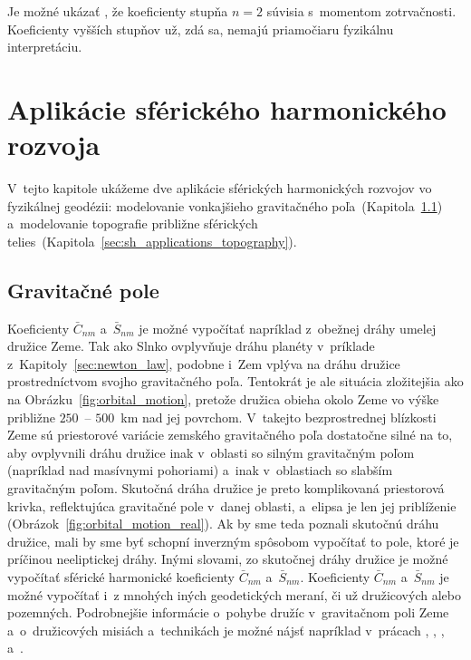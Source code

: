 \documentclass[a4paper, 12pt]{book}
\begin{document}
Je možné ukázať \parencite[napríklad][]{MoritzPhysicalGeodesy}, že koeficienty
stupňa $n = 2$ súvisia s~momentom zotrvačnosti.  Koeficienty vyšších stupňov
už, zdá sa, nemajú priamočiaru fyzikálnu interpretáciu.







\section{Aplikácie sférického harmonického rozvoja}
\label{sec:spherical_harmonics_applications}

V~tejto kapitole ukážeme dve aplikácie sférických harmonických rozvojov vo 
fyzikálnej geodézii: modelovanie vonkajšieho gravitačného 
poľa~(Kapitola~\ref{sec:sh_applications_gravity_field})
a~modelovanie topografie približne sférických 
telies~(Kapitola~\ref{sec:sh_applications_topography}).

\subsection{Gravitačné pole}
\label{sec:sh_applications_gravity_field}

Koeficienty $\bar{C}_{nm}$ a~$\bar{S}_{nm}$ je možné vypočítať napríklad 
z~obežnej dráhy umelej družice Zeme.  Tak ako Slnko ovplyvňuje dráhu planéty 
v~príklade z~Kapitoly~\ref{sec:newton_law}, podobne i~Zem vplýva na dráhu 
družice prostredníctvom svojho gravitačného poľa.  Tentokrát je ale situácia 
zložitejšia ako na Obrázku~\ref{fig:orbital_motion}, pretože družica obieha 
okolo Zeme vo výške približne $250$~-- $500$~km nad jej povrchom.  V~takejto 
bezprostrednej blízkosti Zeme sú priestorové variácie zemského gravitačného 
poľa dostatočne silné na to, aby ovplyvnili dráhu družice inak v~oblasti so 
silným gravitačným poľom (napríklad nad masívnymi pohoriami) a~inak 
v~oblastiach so slabším gravitačným poľom.  Skutočná dráha družice je preto 
komplikovaná priestorová krivka, reflektujúca gravitačné pole v~danej oblasti, 
a~elipsa je len jej priblíženie (Obrázok~\ref{fig:orbital_motion_real}).  Ak by 
sme teda poznali skutočnú dráhu družice, mali by sme byť schopní inverzným 
spôsobom vypočítať to pole, ktoré je príčinou neeliptickej dráhy.  Inými 
slovami, zo skutočnej dráhy družice je možné vypočítať sférické harmonické 
koeficienty $\bar{C}_{nm}$ a~$\bar{S}_{nm}$.  Koeficienty $\bar{C}_{nm}$ 
a~$\bar{S}_{nm}$ je možné vypočítať i~z mnohých iných geodetických meraní, či 
už družicových alebo pozemných.  Podrobnejšie informácie o~pohybe družíc 
v~gravitačnom poli Zeme a~o~družicových misiách a~technikách je možné nájsť 
napríklad v~prácach \textcite{SeeberSatelliteGeodesy}, 
\textcite{MoritzPhysicalGeodesy}, \textcite{Kostelecky2008}, 
\textcite{Melicher2009} a~\textcite{Husar2017}.
\end{document}

